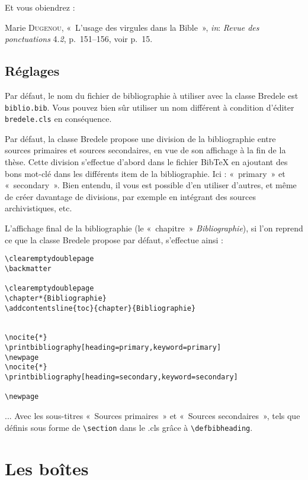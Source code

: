 \documentclass[10pt,a4paper]{article}
\begin{document}
Et vous obiendrez :

Marie \textsc{Dugenou}, «~L'usage des virgules dans la Bible~», \textit{in}: \textit{Revue des ponctuations} 4.\textit{2}, p.~151--156, voir p.~15.



\subsection{Réglages}
Par défaut, le nom du fichier de bibliographie à utiliser avec la classe Bredele est \verb!biblio.bib!. Vous pouvez bien sûr utiliser un nom différent à condition d'éditer \verb!bredele.cls! en conséquence.

Par défaut, la classe Bredele propose une division de la bibliographie entre sources primaires et sources secondaires, en vue de son affichage à la fin de la thèse. Cette division s'effectue d'abord dans le fichier BibTeX en ajoutant des bons mot-clé dans les différents item de la bibliographie. Ici : «~primary~» et «~secondary~». Bien entendu, il vous est possible d'en utiliser d'autres, et même de créer davantage de divisions, par exemple en intégrant des sources archivistiques, etc. 

L'affichage final de la bibliographie (le «~chapitre~» \textit{Bibliographie}), si l'on reprend ce que la classe Bredele propose par défaut, s'effectue ainsi :

\begin{Verbatim}[frame=single, framerule=0.2mm, rulecolor=\color{gray}]
\clearemptydoublepage
\backmatter

\clearemptydoublepage
\chapter*{Bibliographie}
\addcontentsline{toc}{chapter}{Bibliographie}


\nocite{*} 
\printbibliography[heading=primary,keyword=primary]
\newpage
\nocite{*}
\printbibliography[heading=secondary,keyword=secondary]

\newpage
\end{Verbatim}

... Avec les sous-titres «~Sources primaires~» et «~Sources secondaires~», tels que définis sous forme de \verb!\section! dans le .cls grâce à \verb!\defbibheading!.

\section{Les boîtes}
\end{document}

